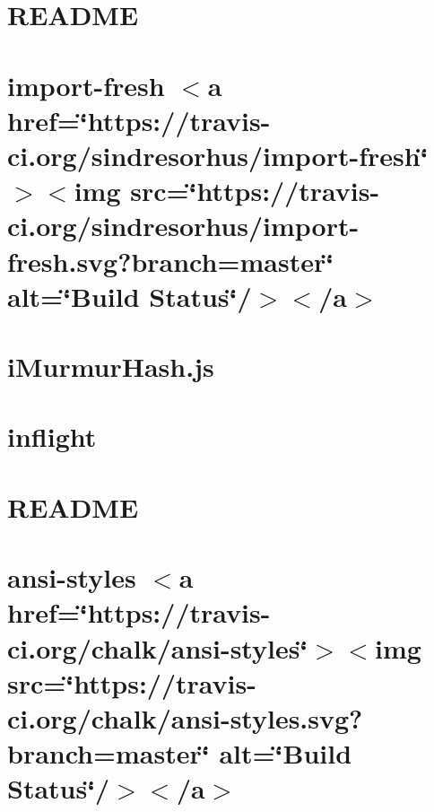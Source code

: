 \let\mypdfximage\pdfximage\def\pdfximage{\immediate\mypdfximage}\documentclass[twoside]{book}
\newcommand{\+}{\discretionary{\mbox{\scriptsize$\hookleftarrow$}}{}{}}
\begin{document}
\chapter{R\+E\+A\+D\+ME}
\label{md_heap-visualizer_node_modules_ignore__r_e_a_d_m_e}

\chapter{import-\/fresh $<$a href=\char`\"{}https\+://travis-\/ci.\+org/sindresorhus/import-\/fresh\char`\"{}$>$$<$img src=\char`\"{}https\+://travis-\/ci.\+org/sindresorhus/import-\/fresh.\+svg?branch=master\char`\"{} alt=\char`\"{}\+Build Status\char`\"{}/$>$$<$/a$>$}
\label{md_heap-visualizer_node_modules_import-fresh_readme}

\chapter{i\+Murmur\+Hash.\+js}
\label{md_heap-visualizer_node_modules_imurmurhash__r_e_a_d_m_e}

\chapter{inflight}
\label{md_heap-visualizer_node_modules_inflight__r_e_a_d_m_e}

\chapter{R\+E\+A\+D\+ME}
\label{md_heap-visualizer_node_modules_inherits__r_e_a_d_m_e}

\chapter{ansi-\/styles $<$a href=\char`\"{}https\+://travis-\/ci.\+org/chalk/ansi-\/styles\char`\"{}$>$$<$img src=\char`\"{}https\+://travis-\/ci.\+org/chalk/ansi-\/styles.\+svg?branch=master\char`\"{} alt=\char`\"{}\+Build Status\char`\"{}/$>$$<$/a$>$}
\label{md_heap-visualizer_node_modules_inquirer_node_modules_ansi-styles_readme}

\end{document}
